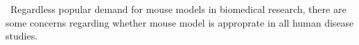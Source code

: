 \ Regardless popular demand for mouse models in biomedical research, there are some concerns regarding whether mouse model is approprate in all human disease studies. 
